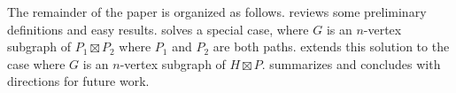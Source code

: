 \documentclass[kpfonts]{patmorin}
\newcommand{\snote}[1]{\fcolorbox{red}{yellow}{#1}}
\DeclareMathOperator{\A}{\mathds{A}}
\begin{document}
The remainder of the paper is organized as follows.  reviews some preliminary definitions and easy results.   solves a special case, where $G$ is an $n$-vertex subgraph of $P_1\boxtimes P_2$ where $P_1$ and $P_2$ are both paths.   extends this solution to the case where $G$ is an $n$-vertex subgraph of $H\boxtimes P$.   summarizes and concludes with directions for future work.

% 
% 
% 


% 
\end{document}
